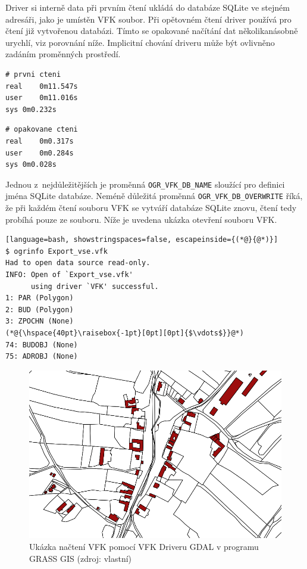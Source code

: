 \documentclass[a4paper,12pt,oneside]{book}
\begin{document}
Driver si interně data při prvním čtení ukládá do databáze SQLite ve stejném adresáři, jako je umístěn VFK soubor. Při opětovném čtení driver používá pro čtení již vytvořenou databázi. Tímto se opakované načítání dat několikanásobně urychlí, viz porovnání níže. Implicitní chování driveru může být ovlivněno zadáním proměnných prostředí.

\begin{multicols}{2}
\begin{lstlisting}
# prvni cteni
real	0m11.547s
user	0m11.016s
sys	0m0.232s
\end{lstlisting}
\columnbreak
\begin{lstlisting}
# opakovane cteni
real	0m0.317s
user	0m0.284s
sys	0m0.028s
\end{lstlisting}
\end{multicols}

Jednou z~nejdůležitějších je proměnná \texttt{OGR\_VFK\_DB\_NAME} sloužící pro definici jména SQLite databáze. Neméně důležitá proměnná
\texttt{OGR\_VFK\_DB\_OVERWRITE} říká, že při každém čtení souboru VFK se vytváří databáze SQLite znovu, čtení tedy probíhá pouze ze souboru. Níže je uvedena ukázka otevření souboru VFK. \cite{gdal_vfk}

\begin{lstlisting}[language=bash, showstringspaces=false, escapeinside={(*@}{@*)}]
$ ogrinfo Export_vse.vfk
Had to open data source read-only.
INFO: Open of `Export_vse.vfk'
      using driver `VFK' successful.
1: PAR (Polygon)
2: BUD (Polygon)
3: ZPOCHN (None)
(*@{\hspace{40pt}\raisebox{-1pt}[0pt][0pt]{$\vdots$}}@*)
74: BUDOBJ (None)
75: ADROBJ (None) 
\end{lstlisting}

\begin{figure}[htbp]
\centering
\includegraphics[width=\textwidth]{images/grass_ukazka.png}
\caption[Ukázka načtení VFK pomocí VFK Driveru GDAL v programu GRASS GIS]{Ukázka načtení VFK pomocí VFK Driveru GDAL v programu GRASS GIS (zdroj: vlastní)}
\end{figure}
\end{document}

